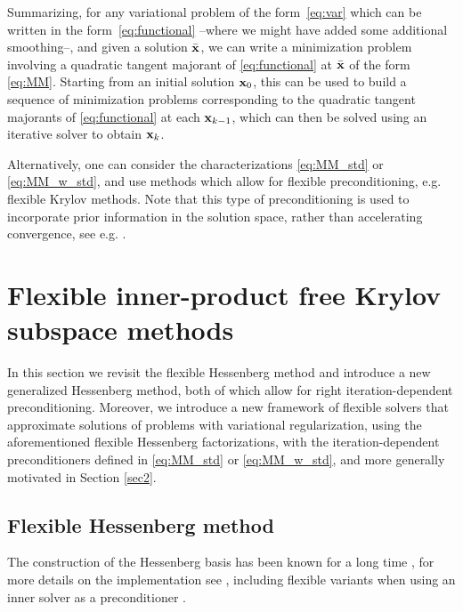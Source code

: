 \documentclass[11pt]{article}
\numberwithin{equation}{section}
\newcommand{\bfx}{{\bf x}}
\begin{document}
Summarizing, for any variational problem of the form~\eqref{eq:var} which can be written in the form~\eqref{eq:functional} –where we might have added some additional smoothing–, and given a solution $\bar\bfx$,  we can write a minimization problem involving a quadratic tangent majorant of \eqref{eq:functional} at $\bar\bfx$ of the form \eqref{eq:MM}. Starting from an initial solution $\bfx_0$, this can be used to build a sequence of minimization problems corresponding to the quadratic tangent majorants of  \eqref{eq:functional} at each $\bfx_{k-1}$, which can then be solved using an iterative solver to obtain $\bfx_{k}$.  

Alternatively, one can consider the characterizations \eqref{eq:MM_std} or  \eqref{eq:MM_w_std}, and use methods which allow for flexible preconditioning, e.g. flexible Krylov methods. Note that this type of preconditioning is used to incorporate prior information in the solution space, rather than accelerating convergence, see e.g.  \cite{calvetti2005priorconditioners}.

\section{Flexible inner-product free Krylov subspace methods}\label{sec3}

In this section we revisit the flexible Hessenberg method and introduce a new generalized Hessenberg method, both of which allow for right iteration-dependent preconditioning. Moreover, we introduce a new framework of flexible solvers that approximate solutions of problems with variational regularization, using the aforementioned flexible Hessenberg factorizations, with the iteration-dependent preconditioners defined in \eqref{eq:MM_std} or \eqref{eq:MM_w_std}, and more generally motivated in Section \ref{sec2}.
 
\subsection{Flexible Hessenberg method}\label{sec:FH}
The construction of the Hessenberg basis has been known for a long time \cite{Hessenberg1940}, for more details on the implementation see \cite{sadok1999new}, including flexible variants when using an inner solver as a preconditioner \cite{Zhang2013CMRHflexible,Gu2020FCMRH}. 
\end{document}
